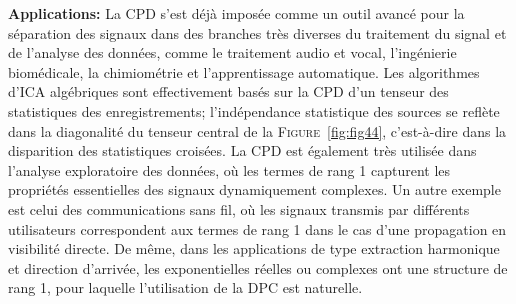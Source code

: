 \documentclass[11pt,a4paper,oneside]{book}
\newtheorem{ex}{Exemple}[chapter]}
\def\C{\mathbb C}
\newcommand{\mbf}[1]{\mathbf{#1}}
\newcommand{\figref}[1]{\textsc{Figure}~\ref{#1}}
\begin{document}
\textbf{Applications: }La CPD s'est déjà imposée comme un outil avancé pour la séparation des signaux dans des branches très diverses du traitement du signal et de l'analyse des données, comme le traitement audio et vocal, l'ingénierie biomédicale, la chimiométrie et l'apprentissage automatique. Les algorithmes d'ICA algébriques sont effectivement basés sur la CPD d'un tenseur des statistiques des enregistrements; l'indépendance statistique des sources se reflète dans la diagonalité du tenseur central de la \figref{fig:fig44}, c'est-à-dire dans la disparition des statistiques croisées. La CPD est également très utilisée dans l'analyse exploratoire des données, où les termes de rang 1 capturent les propriétés essentielles des signaux dynamiquement complexes. Un autre exemple est celui des communications sans fil, où les signaux transmis par différents utilisateurs correspondent aux termes de rang 1 dans le cas d'une propagation en visibilité directe. De même, dans les applications de type extraction harmonique et direction d'arrivée, les exponentielles réelles ou complexes ont une structure de rang 1, pour laquelle l'utilisation de la DPC est naturelle. 
%
\end{document}

